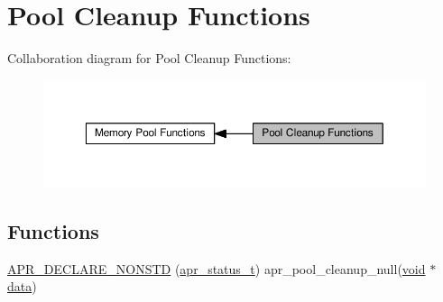 \hypertarget{group__PoolCleanup}{}\section{Pool Cleanup Functions}
\label{group__PoolCleanup}
Collaboration diagram for Pool Cleanup Functions\+:
\nopagebreak
\begin{figure}[H]
\begin{center}
\leavevmode
\includegraphics[width=350pt]{group__PoolCleanup}
\end{center}
\end{figure}
\subsection*{Functions}
\begin{DoxyCompactItemize}
\item 
\hyperlink{group__PoolCleanup_ga18235426bac93f23261221f9b3733bfd}{A\+P\+R\+\_\+\+D\+E\+C\+L\+A\+R\+E\+\_\+\+N\+O\+N\+S\+TD} (\hyperlink{group__apr__errno_gaa5105fa83cc322f09382292db8b47593}{apr\+\_\+status\+\_\+t}) apr\+\_\+pool\+\_\+cleanup\+\_\+null(\hyperlink{group__MOD__ISAPI_gacd6cdbf73df3d9eed42fa493d9b621a6}{void} $\ast$\hyperlink{structdata}{data})
\end{DoxyCompactItemize}
